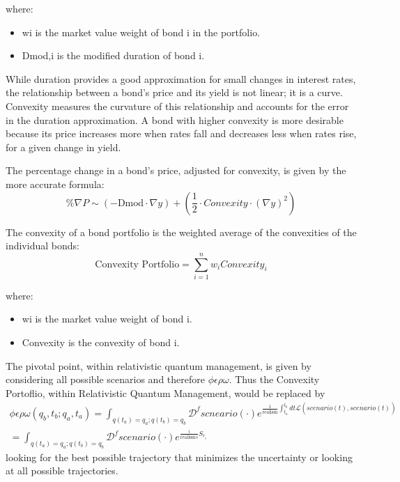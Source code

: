 \documentclass{article}
\begin{document}
where:
\begin{itemize}
\item wi is the market value weight of bond i in the portfolio.
\item Dmod,i is the modified duration of bond i.
\end{itemize}


While duration provides a good approximation for small changes in interest rates, the relationship between a bond's price and its yield is not linear; it is a curve. Convexity measures the curvature of this relationship and accounts for the error in the duration approximation. A bond with higher convexity is more desirable because its price increases more when rates fall and decreases less when rates rise, for a given change in yield.

The percentage change in a bond's price, adjusted for convexity, is given by the more accurate formula:
\begin{equation}
    \%\nabla P \sim (- \text{Dmod} \cdot \nabla y) + (\frac{1}{2} \cdot Convexity \cdot (\nabla y)^2)
\end{equation}


The convexity of a bond portfolio is the weighted average of the convexities of the individual bonds:
\begin{equation}
    \text{Convexity Portfolio} = \sum_{i=1}^n w_i Convexity_i
\end{equation}


where:
\begin{itemize}
\item wi is the market value weight of bond i.
\item Convexity is the convexity of bond i.
\end{itemize}

The pivotal point, within relativistic quantum management, is given by considering all possible scenarios and therefore $\phi \epsilon \rho \omega$.
Thus the Convexity Portoflio, within Relativistic Quantum Management, would be replaced by
\begin{align}
\phi\epsilon\rho\omega(q_b, t_b; q_a, t_a) = \int_{q(t_a)=q_a; q(t_b)=q_b} \mathcal{D}^f scneario(\cdot) e^{\frac{1}{\text{realism}} \int_{t_a}^{t_b} dt \mathcal{L}(scenario(t), \dot{scenario}(t))}\\ = \int_{q(t_a)=q_a; q(t_b)=q_b} \mathcal{D}^f scenario(\cdot) e^{\frac{i}{\text{realism}s} S_{r_i}} 
\end{align}
looking for the best possible trajectory that minimizes the uncertainty or looking at all possible trajectories.
\end{document}
